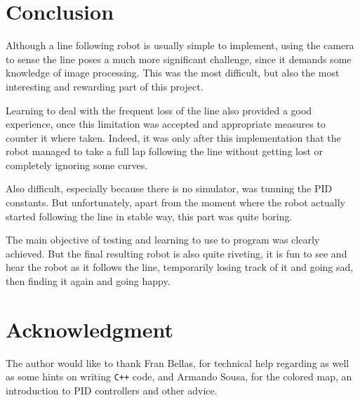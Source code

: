 \documentclass[10pt,conference,compsoc]{IEEEtran}
\begin{document}
\section{Conclusion}

Although a line following robot is usually simple to implement, using the camera to sense the line poses a much more significant challenge, since it demands some knowledge of image processing. This was the most difficult, but also the most interesting and rewarding part of this project. 

Learning to deal with the frequent loss of the line also provided a good experience, once this limitation was accepted and appropriate measures to counter it where taken. Indeed, it was only after this implementation that the robot managed to take a full lap following the line without getting lost or completely ignoring some curves.

Also difficult, especially because there is no simulator, was tunning the PID constants. But unfortunately, apart from the moment where the robot actually started following the line in stable way, this part was quite boring.

The main objective of testing and learning to use \ros to program \robobo was clearly achieved. But the final resulting robot is also quite riveting, it is fun to see and hear the robot as it follows the line, temporarily losing track of it and going sad, then finding it again and going happy.

\section*{Acknowledgment}

The author would like to thank Fran Bellas, for technical help regarding \robobo as well as some hints on writing \texttt{C++} code, and Armando Sousa, for the colored map, an introduction to PID controllers and other advice.



\end{document}
